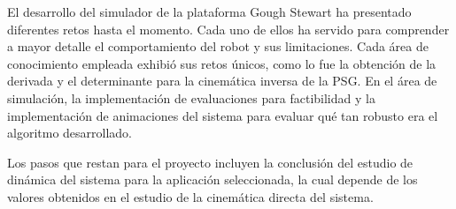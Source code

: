 El desarrollo del simulador de la plataforma Gough Stewart
ha presentado diferentes retos hasta el momento.
Cada uno de ellos ha servido para comprender a 
mayor detalle
el comportamiento del robot y sus limitaciones.
Cada área de conocimiento empleada exhibió 
sus retos únicos, como lo fue la obtención de
la derivada y el determinante para la 
cinemática inversa de la PSG. 
En el área de simulación, la implementación de
evaluaciones para factibilidad y la implementación
de animaciones del sistema para evaluar
qué tan robusto era el algoritmo desarrollado.

Los pasos que restan para el proyecto incluyen la conclusión
del estudio de dinámica del sistema para la 
aplicación seleccionada, la cual depende de los
valores obtenidos en el estudio de la 
cinemática directa del sistema.

